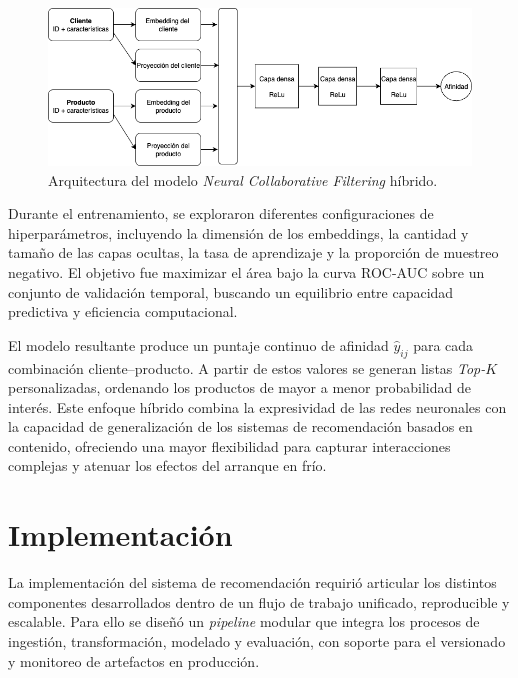 \begin{figure}[htpb]
	\centering
	\includegraphics[scale=.5]{./Figures/ncf_hibrido.png}
	\caption{Arquitectura del modelo \textit{Neural Collaborative Filtering} híbrido.}
	\label{fig:ncf_hibrido}
\end{figure}

Durante el entrenamiento, se exploraron diferentes configuraciones de hiperparámetros, incluyendo la dimensión de los embeddings, la cantidad y tamaño de las capas ocultas, la tasa de aprendizaje y la proporción de muestreo negativo. El objetivo fue maximizar el área bajo la curva ROC-AUC sobre un conjunto de validación temporal, buscando un equilibrio entre capacidad predictiva y eficiencia computacional.

El modelo resultante produce un puntaje continuo de afinidad $\hat{y}_{ij}$ para cada combinación cliente–producto. A partir de estos valores se generan listas \textit{Top-$K$} personalizadas, ordenando los productos de mayor a menor probabilidad de interés. Este enfoque híbrido combina la expresividad de las redes neuronales con la capacidad de generalización de los sistemas de recomendación basados en contenido, ofreciendo una mayor flexibilidad para capturar interacciones complejas y atenuar los efectos del arranque en frío.


\section{Implementación}

La implementación del sistema de recomendación requirió articular los distintos componentes desarrollados dentro de un flujo de trabajo unificado, reproducible y escalable. Para ello se diseñó un \textit{pipeline} modular que integra los procesos de ingestión, transformación, modelado y evaluación, con soporte para el versionado y monitoreo de artefactos en producción.

